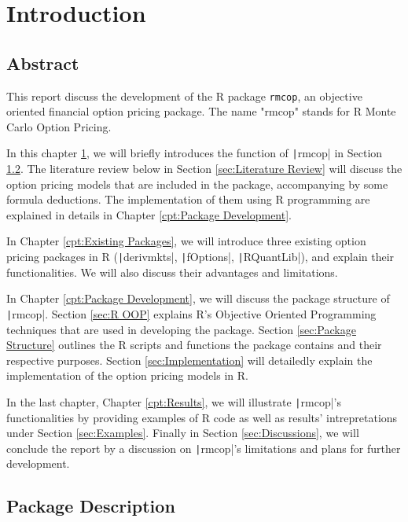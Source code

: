 \chapter{Introduction} \label{cpt:Introduction}

\section{Abstract}
This report discuss the development of the R package \texttt{rmcop}, an objective oriented financial option pricing package. The name "rmcop" stands for R Monte Carlo Option Pricing.

In this chapter \ref{cpt:Introduction}, we will briefly introduces the function of \texttt|rmcop| in Section \ref{sec:Package Description}. The literature review below in Section \ref{sec:Literature Review} will discuss the option pricing models that are included in the package, accompanying by some formula deductions. The implementation of them using R programming are explained in details in Chapter \ref{cpt:Package Development}.

In Chapter \ref{cpt:Existing Packages}, we will introduce three existing option pricing packages in R (\texttt|derivmkts|, \texttt|fOptions|, \texttt|RQuantLib|), and explain their functionalities. We will also discuss their advantages and limitations.

In Chapter \ref{cpt:Package Development}, we will discuss the package structure of \texttt|rmcop|. Section \ref{sec:R OOP} explains R's Objective Oriented Programming techniques that are used in developing the package. Section \ref{sec:Package Structure} outlines the R scripts and functions the package contains and their respective purposes. Section \ref{sec:Implementation} will detailedly explain the implementation of the option pricing models in R.

In the last chapter, Chapter \ref{cpt:Results}, we will illustrate \texttt|rmcop|'s functionalities by providing examples of R code as well as results' intrepretations under Section \ref{sec:Examples}. Finally in Section \ref{sec:Discussions}, we will conclude the report by a discussion on \texttt|rmcop|'s limitations and plans for further development.

\section{Package Description} \label{sec:Package Description}

